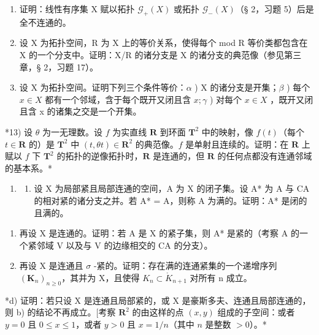 \begin{enumerate}
\def\labelenumi{\arabic{enumi})}
\setcounter{enumi}{9}
\item
  证明：线性有序集 X 赋以拓扑 \(\mathcal{G}_{+}(X)\) 或拓扑 \(\mathcal{G}_{-}(X)\)（§ 2，习题 5）后是全不连通的。
\item
  设 X 为拓扑空间，R 为 X 上的等价关系，使得每个 mod R 等价类都包含在 X 的一个分支中。证明：X/R 的诸分支是 X 的诸分支的典范像（参见第三章，§ 2，习题 17）。
\item
  设 X 为拓扑空间。证明下列三个条件等价：\(\alpha\) ) X 的诸分支是开集；\(\beta\) ) 每个 \(x \in X\) 都有一个邻域，含于每个既开又闭且含 \(x; \gamma\) ) 对每个 \(x \in X\) ，既开又闭且含 x 的诸集之交是一个开集。
\end{enumerate}

*13) 设 \(\theta\) 为一无理数。设 \(f\) 为实直线 \(\mathbf{R}\) 到环面 \(\mathbf{T}^2\) 中的映射，像 \(f(t)\)（每个 \(t \in \mathbf{R}\) 的）是 \(\mathbf{T}^2\) 中 \((t, \theta t) \in \mathbf{R}^2\) 的典范像。\(f\) 是单射且连续的。证明：在 \(\mathbf{R}\) 上赋以 \(f\) 下 \(\mathbf{T}^2\) 的拓扑的逆像拓扑时，\(\mathbf{R}\) 是连通的，但 \(\mathbf{R}\) 的任何点都没有连通邻域的基本系。*

\begin{enumerate}
\def\labelenumi{\arabic{enumi})}
\setcounter{enumi}{13}
\tightlist
\item
  \begin{enumerate}
  \def\labelenumii{\alph{enumii})}
  \tightlist
  \item
    设 X 为局部紧且局部连通的空间，A 为 X 的闭子集。设 A* 为 A 与 CA 的相对紧的诸分支之并。若 A* = A，则称 A 为满的。证明：A* 是闭的且满的。
  \end{enumerate}
\end{enumerate}

\begin{enumerate}
\def\labelenumi{\alph{enumi})}
\setcounter{enumi}{1}
\item
  再设 X 是连通的。证明：若 A 是 X 的紧子集，则 A* 是紧的（考察 A 的一个紧邻域 V 以及与 V 的边缘相交的 CA 的分支）。
\item
  再设 X 是连通且 \(\sigma\) -紧的。证明：存在满的连通紧集的一个递增序列 \((\mathbf{K}_{n})_{n\geqslant0}\)，其并为 X，且使得 \(K_{n}\subset\mathring{K}_{n+1}\) 对所有 n 成立。
\end{enumerate}

*d) 证明：若只设 X 是连通且局部紧的，或 X 是豪斯多夫、连通且局部连通的，则 b) 的结论不再成立。{[}考察 \(\mathbf{R}^2\) 的由这样的点 \((x, y)\) 组成的子空间：或者 \(y = 0\) 且 \(0 \leqslant x \leqslant 1\)，或者 \(y > 0\) 且 \(x = 1/n\)（其中 \(n\) 是整数 \(> 0\)）。*

